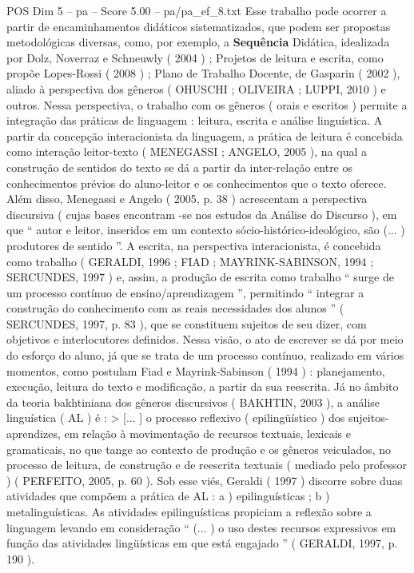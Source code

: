 \begin{textsample}{POS Dim 5 – pa – Score 5.00 – pa/pa\_ef\_8.txt}
Esse trabalho pode ocorrer a partir de encaminhamentos didáticos sistematizados, que podem ser propostas metodológicas diversas, como, por exemplo, a \textbf{Sequência} Didática, idealizada por Dolz, Noverraz e Schneuwly ( 2004 ) ; Projetos de leitura e escrita, como propõe Lopes-Rossi ( 2008 ) ; Plano de Trabalho Docente, de Gasparin ( 2002 ), aliado à perspectiva dos gêneros ( OHUSCHI ; OLIVEIRA ; LUPPI, 2010 ) e outros.
Nessa perspectiva, o trabalho com os gêneros ( orais e escritos ) permite a integração das práticas de linguagem : leitura, escrita e análise linguística.
A partir da concepção interacionista da linguagem, a prática de leitura é concebida como interação leitor-texto ( MENEGASSI ; ANGELO, 2005 ), na qual a construção de sentidos do texto se dá a partir da inter-relação entre os conhecimentos prévios do aluno-leitor e os conhecimentos que o texto oferece.
Além disso, Menegassi e Angelo ( 2005, p. 38 ) acrescentam a perspectiva discursiva ( cujas bases encontram -se nos estudos da Análise do Discurso ), em que “ autor e leitor, inseridos em um contexto sócio-histórico-ideológico, são (... ) produtores de sentido ”.
A escrita, na perspectiva interacionista, é concebida como trabalho ( GERALDI, 1996 ; FIAD ; MAYRINK-SABINSON, 1994 ; SERCUNDES, 1997 ) e, assim, a produção de escrita como trabalho “ surge de um processo contínuo de ensino/aprendizagem ”, permitindo “ integrar a construção do conhecimento com as reais necessidades dos alunos ” ( SERCUNDES, 1997, p. 83 ), que se constituem sujeitos de seu dizer, com objetivos e interlocutores definidos.
Nessa visão, o ato de escrever se dá por meio do esforço do aluno, já que se trata de um processo contínuo, realizado em vários momentos, como postulam Fiad e Mayrink-Sabinson ( 1994 ) : planejamento, execução, leitura do texto e modificação, a partir da sua reescrita.
Já no âmbito da teoria bakhtiniana dos gêneros discursivos ( BAKHTIN, 2003 ), a análise linguística ( AL ) é : > [... ] o processo reflexivo ( epilingüístico ) dos sujeitos-aprendizes, em relação à movimentação de recursos textuais, lexicais e gramaticais, no que tange ao contexto de produção e os gêneros veiculados, no processo de leitura, de construção e de reescrita textuais ( mediado pelo professor ) ( PERFEITO, 2005, p. 60 ).
Sob esse viés, Geraldi ( 1997 ) discorre sobre duas atividades que compõem a prática de AL : a ) epilinguísticas ; b ) metalinguísticas.
As atividades epilinguísticas propiciam a reflexão sobre a linguagem levando em consideração “ (... ) o uso destes recursos expressivos em função das atividades lingüísticas em que está engajado ” ( GERALDI, 1997, p. 190 ).

\end{textsample}
